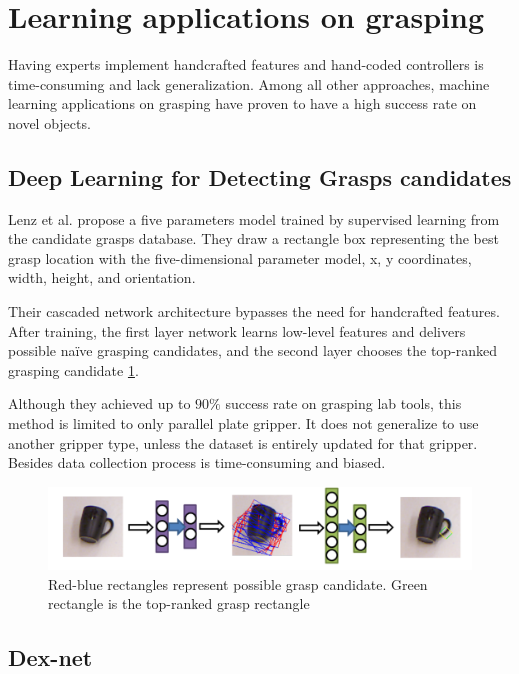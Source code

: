 \section{Learning applications on grasping}

Having experts implement handcrafted features and hand-coded controllers is time-consuming and lack generalization. Among all other approaches, machine learning applications on grasping have proven to have a high success rate on novel objects.


\subsection{Deep Learning for Detecting Grasps candidates}
Lenz et al. propose a five parameters model trained by supervised learning from the candidate grasps database. They draw a rectangle box representing the best grasp location with the five-dimensional parameter model, x, y coordinates, width, height, and orientation.

Their cascaded network architecture bypasses the need for handcrafted features. After training, the first layer network learns low-level features and delivers possible naïve grasping candidates, and the second layer chooses the top-ranked grasping candidate \ref{fig:deeplearngrasp}.

Although they achieved up to \(90\%\) success rate on grasping lab tools, this method is limited to only parallel plate gripper. It does not generalize to use another gripper type, unless the dataset is entirely updated for that gripper. Besides data collection process is time-consuming and biased.

\begin{figure}[htbp]
    \centering
    \includegraphics[width=1.\textwidth]{figures/DeepLearningGrasp}
    \caption{Red-blue rectangles represent possible grasp candidate. Green rectangle is the top-ranked grasp rectangle \cite{Lenz2013}}
    \label{fig:deeplearngrasp}
\end{figure}

\subsection{Dex-net}

